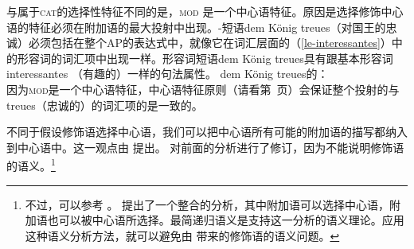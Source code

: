 与属于\textsc{cat}的选择性特征\subcatc 不同的是，\textsc{mod} 是一个中心语特征。原因是选择修饰中心语的特征必须在附加语的最大投射中出现。\nbarc{}-短语dem König treues（对国王的忠诚）必须包括在整个AP的表达式中，就像它在词汇层面的（\ref{le-interessantes}）中的形容词的词汇项中出现一样。形容词短语dem König treues具有跟基本形容词interessantes （有趣的）一样的句法属性。
\ea
\label{avm-dem-koenig-treues}
dem König treues的\catvc：\\
\z
因为\textsc{mod}是一个中心语特征，中心语特征原则（请看第~\pageref{prinzip-hfp}页）会保证整个投射的\modvc 与treues（忠诚的）的词汇项的\modvc 是一致的。

不同于假设修饰语选择中心语，我们可以把中心语所有可能的附加语的描写都纳入到中心语中。这一观点由 \citet[]{ps}提出。 \citet[\S~1.9]{ps2}对前面的分析进行了修订，因为不能说明修饰语的语义。\footnote{%
不过，可以参考 。 提出了一个整合的分析，其中附加语可以选择中心语，附加语也可以被中心语所选择。最简递归语义是支持这一分析的语义理论\indexmrsc。应用这种语义分析方法，就可以避免由 \citet*{ps}带来的修饰语的语义问题。
}

